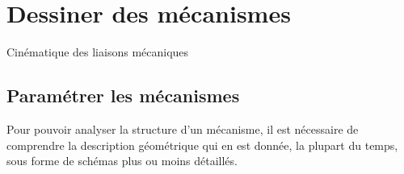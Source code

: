 \documentclass[
	11pt, %
	fleqn, %
	a4paper, %
]{LegrandOrangeBook}
\begin{document}

\chapter{Dessiner des mécanismes}
\begin{corollary}[S3.1.1]
Cinématique des liaisons mécaniques
\end{corollary}



\section{Paramétrer les mécanismes}
Pour pouvoir analyser la structure d’un mécanisme, il est nécessaire de comprendre la description géométrique qui en est donnée, la plupart du temps, sous forme de schémas plus ou moins détaillés.
\end{document}
